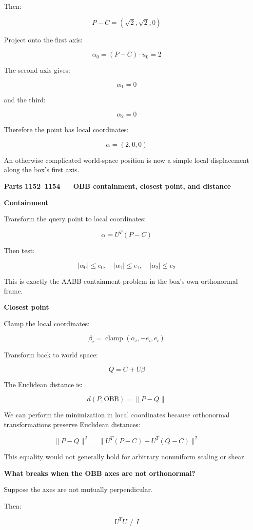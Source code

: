 Then:

\[
P-C=(\sqrt2,\sqrt2,0)
\]

Project onto the first axis:

\[
\alpha_0=(P-C)\cdot u_0=2
\]

The second axis gives:

\[
\alpha_1=0
\]

and the third:

\[
\alpha_2=0
\]

Therefore the point has local coordinates:

\[
\boxed{\alpha=(2,0,0)}
\]

An otherwise complicated world-space position is now a simple local displacement along the box's first axis.

\textbf{Parts 1152--1154 --- OBB containment, closest point, and distance}

\textbf{Containment}

Transform the query point to local coordinates:

\[
\alpha=U^T(P-C)
\]

Then test:

\[
\boxed{ |\alpha_0|\le e_0,\quad |\alpha_1|\le e_1,\quad |\alpha_2|\le e_2 }
\]

This is exactly the AABB containment problem in the box's own orthonormal frame.

\textbf{Closest point}

Clamp the local coordinates:

\[
\beta_i=\operatorname{clamp}(\alpha_i,-e_i,e_i)
\]

Transform back to world space:

\[
\boxed{ Q=C+U\beta }
\]

The Euclidean distance is:

\[
\boxed{ d(P,\mathrm{OBB})=\|P-Q\| }
\]

We can perform the minimization in local coordinates because orthonormal transformations preserve Euclidean distances:

\[
\|P-Q\|^2= \|U^T(P-C)-U^T(Q-C)\|^2
\]

This equality would not generally hold for arbitrary nonuniform scaling or shear.

\textbf{What breaks when the OBB axes are not orthonormal?}

Suppose the axes are not mutually perpendicular.

Then:

\[
U^TU\ne I
\]

